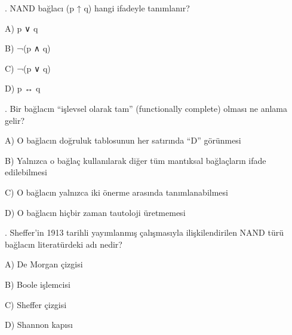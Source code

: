 \par\smallskip{}. NAND bağlacı (p ↑ q) hangi ifadeyle tanımlanır?

\par\noindent\hspace*{1.6em}A) p ∨ q

\par\noindent\hspace*{1.6em}B) ¬(p ∧ q)

\par\noindent\hspace*{1.6em}C) ¬(p ∨ q)

\par\noindent\hspace*{1.6em}D) p ↔ q

\par\smallskip{}. Bir bağlacın “işlevsel olarak tam” (functionally complete) olması ne anlama gelir?

\par\noindent\hspace*{1.6em}A) O bağlacın doğruluk tablosunun her satırında “D” görünmesi

\par\noindent\hspace*{1.6em}B) Yalnızca o bağlaç kullanılarak diğer tüm mantıksal bağlaçların ifade edilebilmesi

\par\noindent\hspace*{1.6em}C) O bağlacın yalnızca iki önerme arasında tanımlanabilmesi

\par\noindent\hspace*{1.6em}D) O bağlacın hiçbir zaman tautoloji üretmemesi

\par\smallskip{}. Sheffer’in 1913 tarihli yayımlanmış çalışmasıyla ilişkilendirilen NAND türü bağlacın literatürdeki adı nedir?

\par\noindent\hspace*{1.6em}A) De Morgan çizgisi

\par\noindent\hspace*{1.6em}B) Boole işlemcisi

\par\noindent\hspace*{1.6em}C) Sheffer çizgisi

\par\noindent\hspace*{1.6em}D) Shannon kapısı

